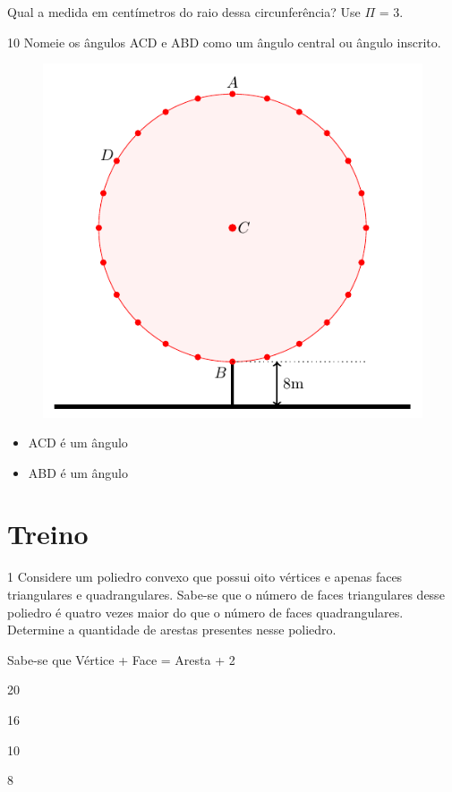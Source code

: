 Qual a medida em centímetros do raio dessa circunferência? Use $\Pi$ = 3. 


\pagebreak
\num{10} Nomeie os ângulos ACD e ABD como um ângulo central ou ângulo
inscrito.

\begin{figure}[htpb!]
\centering
\includegraphics[width=.5\textwidth]{./tikz/022.pdf}
\end{figure}


\begin{itemize}
\item ACD é um ângulo 

\item ABD é um ângulo 
\end{itemize}

\section*{Treino}

\num{1} Considere um poliedro convexo que possui oito vértices e apenas faces
triangulares e quadrangulares. Sabe-se que o número de faces
triangulares desse poliedro é quatro vezes maior do que o número de
faces quadrangulares. Determine a quantidade de arestas presentes nesse
poliedro.

Sabe-se que Vértice + Face = Aresta + 2

\begin{escolha}
  \item 20

  \item 16

  \item 10

  \item 8
\end{escolha}

